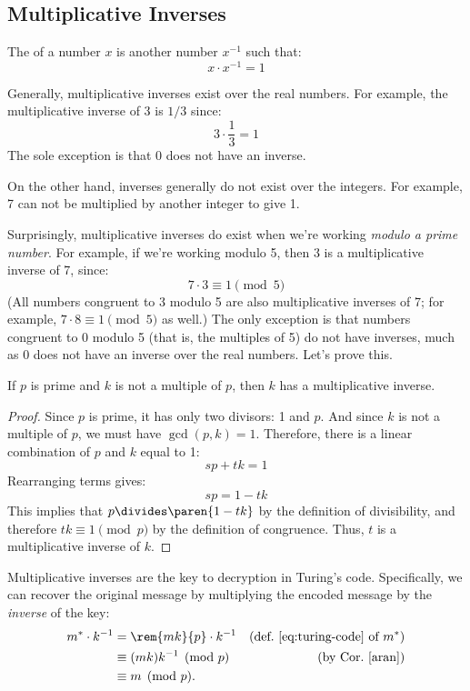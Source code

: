 \subsection{Multiplicative Inverses}
\label{sec:prime}

The  of a number $x$ is another number
$x^{-1}$ such that:
%
\[
x \cdot x^{-1} = 1
\]

Generally, multiplicative inverses exist over the real numbers.  For
example, the multiplicative inverse of 3 is $1 / 3$ since:
%
\[
3 \cdot \frac{1}{3} = 1
\]
%
The sole exception is that 0 does not have an inverse.

On the other hand, inverses generally do not exist over the integers.
For example, 7 can not be multiplied by another integer to give 1.

Surprisingly, multiplicative inverses do exist when we're working
\emph{modulo a prime number}.  For example, if we're working modulo
5, then 3 is a multiplicative inverse of 7, since:
%
\[
7 \cdot 3 \equiv 1 \pmod{5}
\]
%
(All numbers congruent to 3 modulo 5 are also multiplicative inverses
of 7; for example, $7 \cdot 8 \equiv 1 \pmod{5}$ as well.)  The only
exception is that numbers congruent to 0 modulo 5 (that is, the
multiples of 5) do not have inverses, much as 0 does not have an
inverse over the real numbers.  Let's prove this.

\begin{lemma}
\label{lem:inverses}
If $p$ is prime and $k$ is not a multiple of $p$, then $k$ has a
multiplicative inverse.
\end{lemma}

\begin{proof}
Since $p$ is prime, it has only two divisors: 1 and $p$.  And since
$k$ is not a multiple of $p$, we must have $\gcd(p, k) = 1$.
Therefore, there is a linear combination of $p$ and $k$ equal to 1:
%
\[
s p + t k = 1
\]
%
Rearranging terms gives:
%
\[
s p = 1 - t k
\]
%
This implies that $p \divides \paren{1 - tk}$ by the definition of divisibility,
and therefore $tk \equiv 1 \pmod{p}$ by the definition of congruence.
Thus, $t$ is a multiplicative inverse of $k$.
\end{proof}

Multiplicative inverses are the key to decryption in Turing's code.
Specifically, we can recover the original message by multiplying the
encoded message by the \emph{inverse} of the key:
\begin{align*}
m^* \cdot k^{-1}
    & = \rem{mk}{p} \cdot k^{-1}
         & \text{(def.~\eqref{eq:turing-code} of $m^*$)}\\
    & \equiv (mk)k^{-1} \pmod{p} & \text{(by Cor.~\ref{aran})}\\
    & \equiv m \pmod{p}.
\end{align*}

